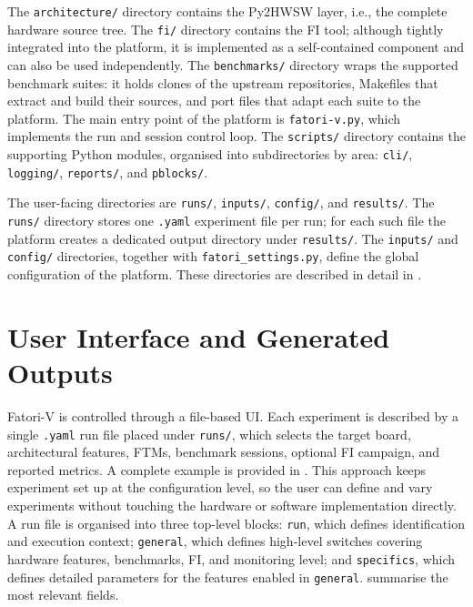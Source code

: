 The \texttt{architecture/} directory contains the Py2HWSW layer, i.e., the complete hardware source tree. The \texttt{fi/} directory contains the \ac{FI} tool; although tightly integrated into the platform, it is implemented as a self-contained component and can also be used independently. The \texttt{benchmarks/} directory wraps the supported benchmark suites: it holds clones of the upstream repositories, Makefiles that extract and build their sources, and port files that adapt each suite to the platform. The main entry point of the platform is \texttt{fatori-v.py}, which implements the run and session control loop. The \texttt{scripts/} directory contains the supporting Python modules, organised into subdirectories by area: \texttt{cli/}, \texttt{logging/}, \texttt{reports/}, and \texttt{pblocks/}.

The user-facing directories are \texttt{runs/}, \texttt{inputs/}, \texttt{config/}, and \texttt{results/}. The \texttt{runs/} directory stores one \texttt{.yaml} experiment file per run; for each such file the platform creates a dedicated output directory under \texttt{results/}. The \texttt{inputs/} and \texttt{config/} directories, together with \texttt{fatori\_settings.py}, define the global configuration of the platform. These directories are described in detail in .




\section{User Interface and Generated Outputs}
\label{chap3:UI}

\ac{Fatori-V} is controlled through a file-based \ac{UI}. Each experiment is described by a single \texttt{.yaml} run file placed under \texttt{runs/}, which selects the target board, architectural features, \acp{FTM}, benchmark sessions, optional \ac{FI} campaign, and reported metrics. A complete example is provided in . This approach keeps experiment set up at the configuration level, so the user can define and vary experiments without touching the hardware or software implementation directly. A run file is organised into three top-level blocks: \texttt{run}, which defines identification and execution context; \texttt{general}, which defines high-level switches covering hardware features, benchmarks, \ac{FI}, and monitoring level; and \texttt{specifics}, which defines detailed parameters for the features enabled in \texttt{general}.  summarise the most relevant fields.


